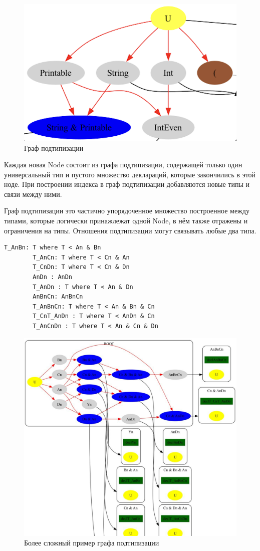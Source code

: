 \documentclass[times]{itmo-student-thesis}
\begin{document}
		\begin{figure}[!h]
		\caption{Граф подтипизации} \label{subtypegraph}
		\centering
		\includegraphics[width=0.8\columnwidth]{images/subtyping_graph.png}
	\end{figure}
	
	Каждая новая Node состоит из графа подтипизации, содержащей только один универсальный тип и пустого множество деклараций, которые закончились в этой ноде. При построении индекса в граф подтипизации добавляются новые типы и связи между ними.
	
	Граф подтипизации это частично упорядоченное множество построенное между типами, которые логически принажлежат одной Node, в нём также отражены и ограничения на типы. Отношения подтипизации могут связывать любые два типа. 

	\begin{lstlisting}[caption={Множество деклараций на основании которых построен поисковый индекс на рисунке ~\ref{subtypegraphhard}},label={subtyping_example}]
		T_AnBn: T where T < An & Bn
		T_AnCn: T where T < Cn & An
		T_CnDn: T where T < Cn & Dn
		AnDn : AnDn
		T_AnDn : T where T < An & Dn
		AnBnCn: AnBnCn
		T_AnBnCn: T where T < An & Bn & Cn
		T_CnT_AnDn : T where T < AnDn & Cn
		T_AnCnDn : T where T < An & Cn & Dn
	\end{lstlisting}
	
	\begin{figure}[!h]
		\caption{Более сложный пример графа подтипизации} \label{subtypegraphhard}
		\centering
		\includegraphics[width=0.8\columnwidth]{images/subtyping_hard.jpg}
	\end{figure}
	
\end{document}
